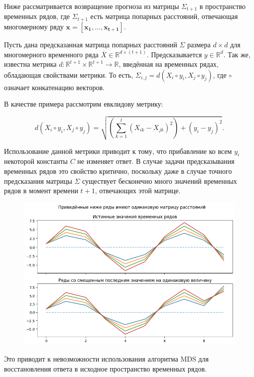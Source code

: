 \documentclass{article}
\begin{document}
Ниже рассматривается возвращение прогноза из матрицы $\Sigma_{t+1}$ в пространство временных рядов, где $\Sigma_{t+1}$ есть матрица попарных расстояний, отвечающая многомерному ряду $\mathbf{x}=[\mathbf{x_1}, \ldots, \mathbf{x_{t+1}}]$.

Пусть дана предсказанная матрица попарных расстояний $\Sigma$ размера $d \times d$ для многомерного временного ряда $\overline{X} \in \mathbb{R}^{d \times (t+1)}$. Предсказывается $y \in \mathbb{R}^d$. Так же, известна метрика $d : \mathbb{R}^{t+1} \times \mathbb{R}^{t+1} \rightarrow \mathbb{R}$, введённая на временных рядах, обладающая свойствами метрики. То есть, $\Sigma_{i,j} = d(X_i \circ y_i, X_j \circ y_j)$, где $\circ$ означает конкатенацию векторов.

В качестве примера рассмотрим евклидову метрику: 

$$d(X_i \circ y_i, X_j \circ y_j)=\sqrt{\left(\sum_{k=1}^t (X_{ik}-X_{jk})^2\right) + (y_i-y_j)^2}.$$

Использование данной метрики приводит к тому, что прибавление ко всем $y_i$ некоторой константы $C$ не изменяет ответ. В случае задачи предсказывания временных рядов это свойство критично, поскольку даже в случае точного предсказания матрицы $\Sigma$ существует бесконечно много значений временных рядов в момент времени $t+1$, отвечающих этой матрице.

\begin{figure}[H]
	\centering
	\includegraphics[width=\textwidth]{SameMatrix.png}
	\label{fig:fig1}
\end{figure}

Это приводит к невозможности использования алгоритма MDS для восстановления ответа в исходное пространство временных рядов.
\end{document}
